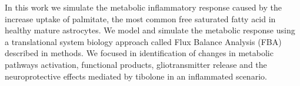 
In this work we simulate the metabolic inflammatory response caused by the increase uptake of palmitate,  the most common free saturated fatty acid in healthy mature astrocytes. We model and simulate the metabolic response using a translational system biology approach called Flux Balance Analysis (FBA) described in methods. We focused in identification of changes in metabolic pathways activation, functional products, gliotransmitter release and the neuroprotective effects mediated by tibolone in an inflammated scenario.

